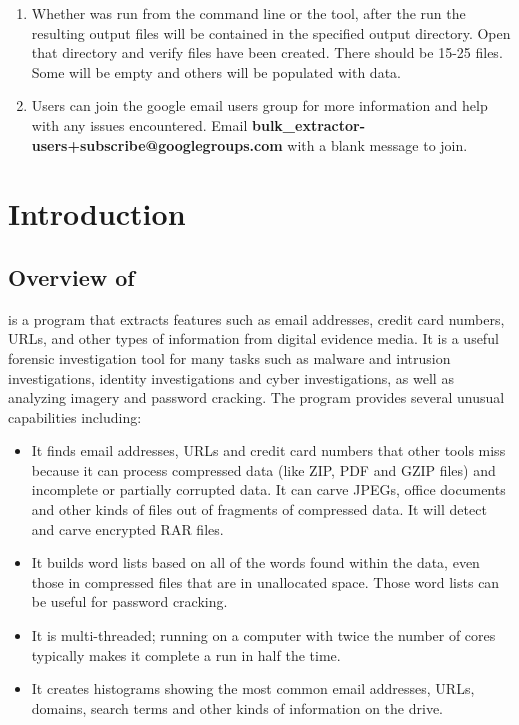 \documentclass[11pt]{article} %
\begin{document}
\begin{enumerate}
\item Whether \bulk was run from the command line or the \viewer tool, after the run the resulting output files will be contained in the specified output directory. Open that directory and verify files have been created. There should be 15-25 files. Some will be empty and others will be populated with data.

\item Users can join the google email users group for more information and help with any issues encountered. Email \textbf{bulk\_extractor-users+subscribe@googlegroups.com} with a blank message to join.
\end{enumerate}
\newpage


\tableofcontents
\newpage
{}





\newpage

\section{Introduction}

\subsection{Overview of \bulk}
\bulk is a program that extracts features such as email addresses, credit card numbers, URLs, and other types of information from digital evidence media. It is a useful forensic investigation tool for many tasks such as malware and intrusion investigations, identity investigations and cyber investigations, as well as analyzing imagery and password cracking. The program provides several unusual capabilities including:
\begin{itemize}
\item It finds email addresses, URLs and credit card numbers that other tools miss because it can process compressed data (like ZIP, PDF and GZIP files) and incomplete or partially corrupted data. It can carve JPEGs, office documents and other kinds of files out of fragments of compressed data. It will detect and carve encrypted RAR files.
\item It builds word lists based on all of the words found within the data, even those in compressed files that are in unallocated space. Those word lists can be useful for password cracking.
\item It is multi-threaded; running \bulk on a computer with twice the number of cores typically makes it complete a run in half the time.
\item It creates histograms showing the most common email addresses, URLs, domains, search terms and other kinds of information on the drive.
\end{itemize}
\end{document}
